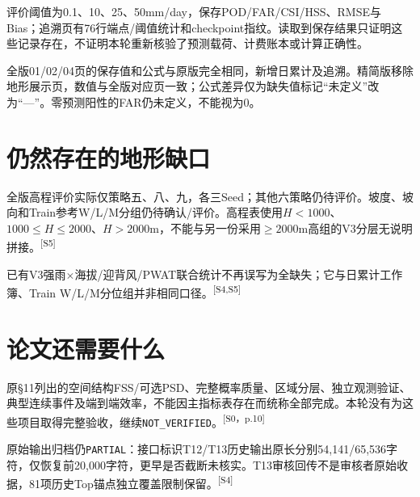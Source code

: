 \documentclass[UTF8,10.5pt,a4paper,fontset=none]{ctexart}
\newcommand{\evi}[1]{\textsuperscript{\color{muted}[#1]}}
\begin{document}
评价阈值为0.1、10、25、50mm/day，保存POD/FAR/CSI/HSS、RMSE与Bias；追溯页有76行端点/阈值统计和checkpoint指纹。读取到保存结果只证明这些记录存在，不证明本轮重新核验了预测载荷、计费账本或计算正确性。

全版01/02/04页的保存值和公式与原版完全相同，新增日累计及追溯。精简版移除地形展示页，数值与全版对应页一致；公式差异仅为缺失值标记“未定义”改为“—”。零预测阳性的FAR仍未定义，不能视为0。

\section*{仍然存在的地形缺口}
全版高程评价实际仅策略五、八、九，各三Seed；其他六策略仍待评价。坡度、坡向和Train参考W/L/M分组仍待确认/评价。高程表使用$H<1000$、$1000\le H\le2000$、$H>2000$m，不能与另一份采用$\ge2000$m高组的V3分层无说明拼接。\evi{S5}

已有V3强雨$\times$海拔/迎背风/PWAT联合统计不再误写为全缺失；它与日累计工作簿、Train W/L/M分位组并非相同口径。\evi{S4,S5}

\section*{论文还需要什么}
原§11列出的空间结构FSS/可选PSD、完整概率质量、区域分层、独立观测验证、典型连续事件及端到端效率，不能因主指标表存在而统称全部完成。本轮没有为这些项目取得完整验收，继续\texttt{NOT\_VERIFIED}。\evi{S0，p.10}

原始输出归档仍\texttt{PARTIAL}：接口标识T12/T13历史输出原长分别54,141/65,536字符，仅恢复前20,000字符，更早是否截断未核实。T13审核回传不是审核者原始收据，81项历史Top锚点独立覆盖限制保留。\evi{S4}
\end{document}
